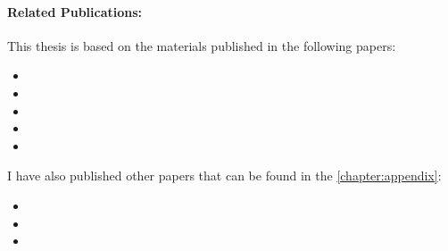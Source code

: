 \paragraph{Related Publications:} This thesis is based on the materials published in the following papers:

\begin{itemize}
      \item {}
      \item {}
      \item {}
      \item {}
      \item {}
\end{itemize}

I have also published other papers that can be found in the \autoref{chapter:appendix}:

\begin{itemize}
      \item {}
      \item {}
      \item {}
\end{itemize}

